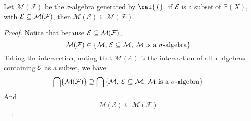 \documentclass[../../main.tex]{subfiles}
\begin{document}
\newcommand{\me}{\mathcal{M}(\mathcal{E})}
\newcommand{\mf}{\mathcal{M}(\mathcal{F})}
\begin{wts}
    Let $\mf$ be the $\sigma$-algebra generated by $\cal{f}$, if $\cal{E}$ is a subset of $\mathbb{P}(X)$, with $\cal{E}\subseteq\mf$, then $\me\subseteq\mf$.
\end{wts}
\begin{proof}
    Notice that because $\cal{E}\subseteq\mf$, 
    \[
    \mf\in\left\{\cal{M},\:\cal{E}\subseteq \cal{M},\:\text{$\cal{M}$ is a $\sigma$-algebra}\right\}
    \]
    Taking the intersection, noting that $\me$ is the intersection of all $\sigma$-algebras containing $\cal{E}$ as a subset, we have
    \[
    \bigcap \{\mf\}\supseteq \bigcap \left\{\cal{M},\:\cal{E}\subseteq \cal{M},\:\text{$\cal{M}$ is a $\sigma$-algebra}\right\}
    \]
    And
    \[
    \me\subseteq\mf
    \]
\end{proof}
\end{document}
